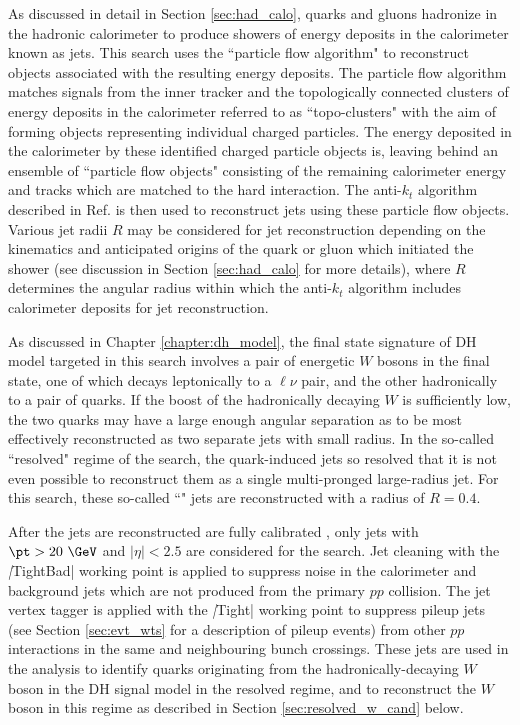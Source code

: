 As discussed in detail in Section \ref{sec:had_calo}, quarks and gluons hadronize in the hadronic calorimeter to produce showers of energy deposits in the calorimeter known as jets. This search uses the ``particle flow algorithm" \cite{PERF-2015-09} to reconstruct objects associated with the resulting energy deposits. The particle flow algorithm matches signals from the inner tracker and the topologically connected clusters of energy deposits in the calorimeter referred to as ``topo-clusters" with the aim of forming objects representing individual charged particles. The energy deposited in the calorimeter by these identified charged particle objects is, leaving behind an ensemble of ``particle flow objects" consisting of the remaining calorimeter energy and tracks which are matched to the hard interaction. The anti-\(k_t\) algorithm described in Ref. \cite{akt_algo} is then used to reconstruct jets using these particle flow objects. Various jet radii \(R\) may be considered for jet reconstruction depending on the kinematics and anticipated origins of the quark or gluon which initiated the shower (see discussion in Section \ref{sec:had_calo} for more details), where \(R\) determines the angular radius within which the anti-\(k_t\) algorithm includes calorimeter deposits for jet reconstruction. 

As discussed in Chapter \ref{chapter:dh_model}, the final state signature of DH model targeted in this search involves a pair of energetic \(W\) bosons in the final state, one of which decays leptonically to a \(\ell\nu\) pair, and the other hadronically to a pair of quarks. If the boost of the hadronically decaying \(W\) is sufficiently low, the two quarks may have a large enough angular separation as to be most effectively reconstructed as two separate jets with small radius. In the so-called ``resolved" regime of the search, the quark-induced jets so resolved that it is not even possible to reconstruct them as a single multi-pronged large-radius jet. For this search, these so-called ``\SmallR" jets are reconstructed with a radius of \(R=0.4\).

After the \SmallR jets are reconstructed are fully calibrated \cite{ATLAS-CONF-2015-037}, only jets with \(\pt > 20~\GeV\) and \(|\eta| < 2.5\) are considered for the search. Jet cleaning \cite{ATLAS-CONF-2015-029} with the \emph|TightBad| working point is applied to suppress noise in the calorimeter and background jets which are not produced from the primary \(pp\) collision. The jet vertex tagger \cite{ATLAS-CONF-2014-018} is applied with the \emph|Tight| working point to suppress pileup jets \cite{pileup} (see Section \ref{sec:evt_wts} for a description of pileup events) from other \(pp\) interactions in the same and neighbouring bunch crossings. These jets are used in the analysis to identify quarks originating from the hadronically-decaying \(W\) boson in the DH signal model in the resolved regime, and to reconstruct the \(W\) boson in this regime as described in Section \ref{sec:resolved_w_cand} below. 

